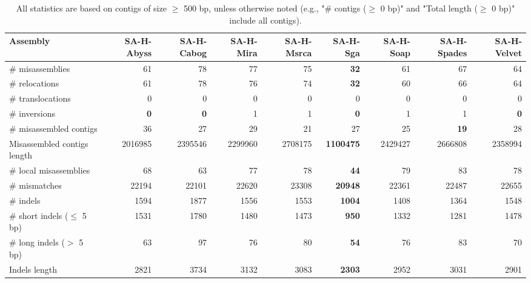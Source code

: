 \documentclass[12pt,a4paper]{article}
\begin{document}
\begin{table}[ht]
\begin{center}
\caption{All statistics are based on contigs of size $\geq$ 500 bp, unless otherwise noted (e.g., "\# contigs ($\geq$ 0 bp)" and "Total length ($\geq$ 0 bp)" include all contigs).}
\begin{tabular}{|l*{8}{|r}|}
\hline
Assembly & SA-H-Abyss & SA-H-Cabog & SA-H-Mira & SA-H-Msrca & SA-H-Sga & SA-H-Soap & SA-H-Spades & SA-H-Velvet \\ \hline
\# misassemblies & 61 & 78 & 77 & 75 & {\bf 32} & 61 & 67 & 64 \\ \hline
\hspace{5mm}\# relocations & 61 & 78 & 76 & 74 & {\bf 32} & 60 & 66 & 64 \\ \hline
\hspace{5mm}\# translocations & 0 & 0 & 0 & 0 & 0 & 0 & 0 & 0 \\ \hline
\hspace{5mm}\# inversions & {\bf 0} & {\bf 0} & 1 & 1 & {\bf 0} & 1 & 1 & {\bf 0} \\ \hline
\# misassembled contigs & 36 & 27 & 29 & 21 & 27 & 25 & {\bf 19} & 28 \\ \hline
Misassembled contigs length & 2016985 & 2395546 & 2299960 & 2708175 & {\bf 1100475} & 2429427 & 2666808 & 2358994 \\ \hline
\# local misassemblies & 68 & 63 & 77 & 78 & {\bf 44} & 79 & 83 & 78 \\ \hline
\# mismatches & 22194 & 22101 & 22620 & 23308 & {\bf 20948} & 22361 & 22487 & 22655 \\ \hline
\# indels & 1594 & 1877 & 1556 & 1553 & {\bf 1004} & 1408 & 1364 & 1548 \\ \hline
\hspace{5mm}\# short indels ($\leq$ 5 bp) & 1531 & 1780 & 1480 & 1473 & {\bf 950} & 1332 & 1281 & 1478 \\ \hline
\hspace{5mm}\# long indels ($>$ 5 bp) & 63 & 97 & 76 & 80 & {\bf 54} & 76 & 83 & 70 \\ \hline
Indels length & 2821 & 3734 & 3132 & 3083 & {\bf 2303} & 2952 & 3031 & 2901 \\ \hline
\end{tabular}
\end{center}
\end{table}
\end{document}
